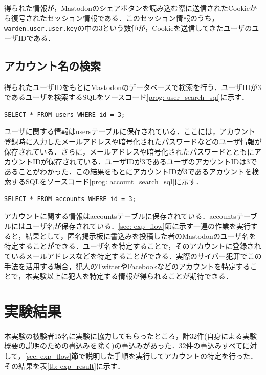 \documentclass[10pt, a4paper]{jreport}
\begin{document}
得られた情報が，Mastodonのシェアボタンを読み込む際に送信されたCookieから復号されたセッション情報である．このセッション情報のうち，\verb|warden.user.user.key|の中の3という数値が，Cookieを送信してきたユーザのユーザIDである．

\subsection{アカウント名の検索}
得られたユーザIDをもとにMastodonのデータベースで検索を行う．ユーザIDが3であるユーザを検索するSQLをソースコード\ref{prog: user_search_sql}に示す．

\begin{lstlisting}[caption=ユーザIDが3であるユーザを検索するSQL,label=prog: user_search_sql]
SELECT * FROM users WHERE id = 3;
\end{lstlisting}

ユーザに関する情報はusersテーブルに保存されている．ここには，アカウント登録時に入力したメールアドレスや暗号化されたパスワードなどのユーザ情報が保存されている．さらに，メールアドレスや暗号化されたパスワードとともにアカウントIDが保存されている．ユーザIDが3であるユーザのアカウントIDは3であることがわかった．この結果をもとにアカウントIDが3であるアカウントを検索するSQLをソースコード\ref{prog: account_search_sql}に示す．

\begin{lstlisting}[caption=アカウントIDが3であるアカウントを検索するSQL,label=prog: account_search_sql]
SELECT * FROM accounts WHERE id = 3;
\end{lstlisting}

アカウントに関する情報はaccountsテーブルに保存されている．accountsテーブルにはユーザ名が保存されている．\ref{sec: exp_flow}節に示す一連の作業を実行すると，結果として，匿名掲示板に書込みを投稿した者のMastodonのユーザ名を特定することができる．ユーザ名を特定することで，そのアカウントに登録されているメールアドレスなどを特定することができる．実際のサイバー犯罪でこの手法を活用する場合，犯人のTwitterやFacebookなどのアカウントを特定することで，本実験以上に犯人を特定する情報が得られることが期待できる．

\section{実験結果}\label{sec: exp_result}
本実験の被験者15名に実験に協力してもらったところ，計32件(自身による実験概要の説明のための書込みを除く)の書込みがあった．32件の書込みすべてに対して，\ref{sec: exp_flow}節で説明した手順を実行してアカウントの特定を行った．その結果を表\ref{tb: exp_result}に示す．
\end{document}
